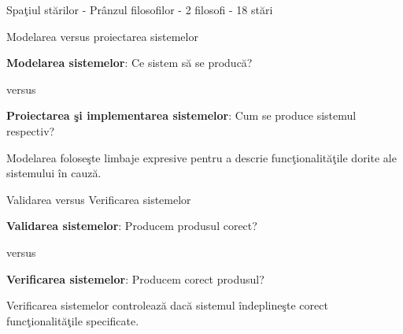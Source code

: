 \documentclass{beamer}
\begin{document}
\begin{frame}{Spaţiul stărilor - Prânzul filosofilor - 2 filosofi - 18 stări}
\begin{center}

\end{center}
\end{frame}



\begin{frame}{Modelarea versus proiectarea sistemelor}

\textbf{Modelarea sistemelor}: Ce sistem să se producă?

\vspace{0.5cm}

versus

\vspace{0.5cm}

\textbf{Proiectarea şi implementarea sistemelor}: Cum se produce sistemul respectiv?

\vspace{0.5cm}

Modelarea foloseşte limbaje expresive pentru a descrie funcţionalităţile dorite ale sistemului în cauză.

\end{frame}



\begin{frame}{Validarea versus Verificarea sistemelor}

\textbf{Validarea sistemelor}: Producem produsul corect?

\vspace{0.5cm}

versus

\vspace{0.5cm}

\textbf{Verificarea sistemelor}: Producem corect produsul?

\vspace{0.5cm}

Verificarea sistemelor controlează dacă sistemul îndeplineşte corect funcţionalităţile specificate.
\end{frame}
\end{document}
